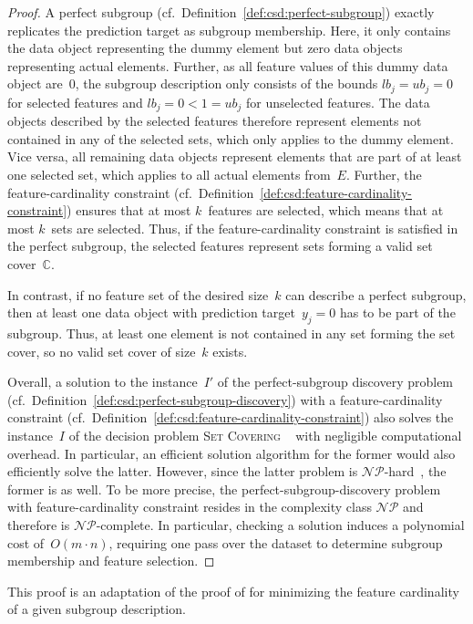\documentclass{article}
\theoremstyle{definition}
\begin{document}
\begin{proof}
A perfect subgroup (cf.~Definition~\ref{def:csd:perfect-subgroup}) exactly replicates the prediction target as subgroup membership.
Here, it only contains the data object representing the dummy element but zero data objects representing actual elements.
Further, as all feature values of this dummy data object are~0, the subgroup description only consists of the bounds $\mathit{lb}_j = \mathit{ub}_j = 0$ for selected features and $\mathit{lb}_j = 0 < 1 = \mathit{ub}_j$ for unselected features.
The data objects described by the selected features therefore represent elements not contained in any of the selected sets, which only applies to the dummy element.
Vice versa, all remaining data objects represent elements that are part of at least one selected set, which applies to all actual elements from~$E$.
Further, the feature-cardinality constraint (cf.~Definition~\ref{def:csd:feature-cardinality-constraint}) ensures that at most $k$~features are selected, which means that at most $k$~sets are selected.
Thus, if the feature-cardinality constraint is satisfied in the perfect subgroup, the selected features represent sets forming a valid set cover~$\mathbb{C}$.

In contrast, if no feature set of the desired size~$k$ can describe a perfect subgroup, then at least one data object with prediction target~$y_j = 0$ has to be part of the subgroup.
Thus, at least one element is not contained in any set forming the set cover, so no valid set cover of size~$k$ exists.

Overall, a solution to the instance~$I'$ of the perfect-subgroup discovery problem (cf.~Definition~\ref{def:csd:perfect-subgroup-discovery}) with a feature-cardinality constraint (cf.~Definition~\ref{def:csd:feature-cardinality-constraint}) also solves the instance~$I$ of the decision problem \textsc{Set Covering} ~\cite{karp1972reducibility} with negligible computational overhead.
In particular, an efficient solution algorithm for the former would also efficiently solve the latter.
However, since the latter problem is $\mathcal{NP}$-hard~\cite{karp1972reducibility}, the former is as well.
To be more precise, the perfect-subgroup-discovery problem with feature-cardinality constraint resides in the complexity class $\mathcal{NP}$ and therefore is $\mathcal{NP}$-complete.
In particular, checking a solution induces a polynomial cost of~$O(m \cdot n)$, requiring one pass over the dataset to determine subgroup membership and feature selection.
\end{proof}
%
This proof is an adaptation of the proof of \cite{boley2009non} for minimizing the feature cardinality of a given subgroup description.
\end{document}
